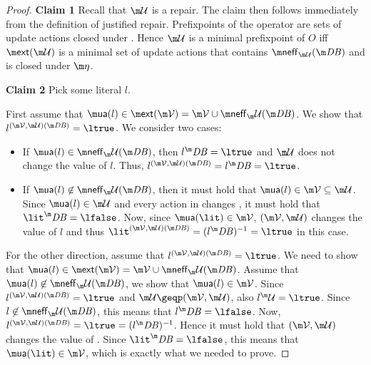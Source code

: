 \begin{proof}
% 

\textbf{Claim 1}
Recall that $\UU$ is a repair. 
The claim then
follows immediately from the definition of justified repair. Prefixpoints of the \closure operator are sets of update actions closed under \aics. Hence $\UU$ is a minimal prefixpoint of $O$ iff $\ext(\UU)$ is a minimal set of update actions that contains $\neff_{\UU}(\db)$ and is closed under $\aics$. 


\textbf{Claim 2} Pick some literal $l$.

First assume that $\actof(l)\in\ext(\VV)=\VV\cup\neff_\UU(\db)$. We show that $l^{( \VV,  \UU)(\db)} = \ltrue$. 
 We consider two cases:
\begin{itemize}
 \item If $\actof(l)\in \neff_\UU(\db)$, then $l^\db = \ltrue$ and $\UU$ does not change the value of $l$. Thus, $l^{( \VV, \UU)(\db)} = l^\db = \ltrue$. 
 \item If $\actof(l)\not\in \neff_\UU(\db)$, then it must hold that $\actof(l) \in \VV\subseteq \UU$. Since $\actof(l)\in \UU$ and every action in \UU changes \db, it must hold that $\lit^\db=\lfalse$. Now, since $\actof(\lit) \in \VV$, $( \VV,  \UU)$ changes the value of $l$ and thus $\lit^{(\VV,\UU)(\db)} = (l^\db)^{-1} = \ltrue$ in this case. 
\end{itemize}
For the other direction, assume that $l^{( \VV,  \UU)(\db)} = \ltrue$. We need to show that $\actof(l)\in\ext(\VV)=\VV\cup\neff_\UU(\db)$. Assume that $\actof(l)\not\in \neff_\UU(\db)$, we show that $\actof(l)\in \VV$. 
Since $l^{( \VV,  \UU)(\db)} = \ltrue$ and $\UU\geqp (\VV,\UU)$, also $l^\UU=\ltrue$. Since $l\not\in \neff_\UU(\db)$, this means that $l^\db=\lfalse$.
Now,
$l^{( \VV,  \UU)(\db)} = \ltrue = (l^\db)^{-1}$. Hence it must hold that $( \VV, \UU)$ changes the value of \lit. Since $\lit^\db = \lfalse$, this means that $  \actof{(\lit)}\in \VV$, which is exactly what we needed to prove. 



\end{proof}
